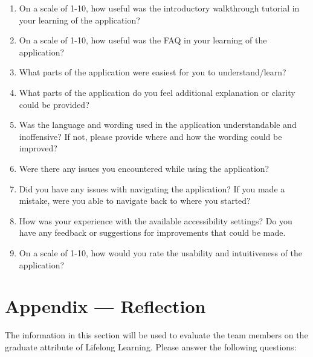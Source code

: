 \documentclass[12pt, titlepage]{article}
\begin{document}
\begin{enumerate}
  \item On a scale of 1-10, how useful was the introductory walkthrough tutorial in your learning of the application?
  \item On a scale of 1-10, how useful was the FAQ in your learning of the application?
  \item What parts of the application were easiest for you to understand/learn?
  \item What parts of the application do you feel additional explanation or clarity could be provided?
  \item Was the language and wording used in the application understandable and inoffensive? If not, please
  provide where and how the wording could be improved?
  \item Were there any issues you encountered while using the application?
  \item Did you have any issues with navigating the application? If you made a mistake, were you able to navigate
  back to where you started?
  \item How was your experience with the available accessibility settings? Do you have any feedback or suggestions for
  improvements that could be made.
  \item On a scale of 1-10, how would you rate the usability and intuitiveness of the application?
\end{enumerate}

\newpage{}
\section*{Appendix --- Reflection}

The information in this section will be used to evaluate the team members on the
graduate attribute of Lifelong Learning.  Please answer the following questions:
\end{document}
